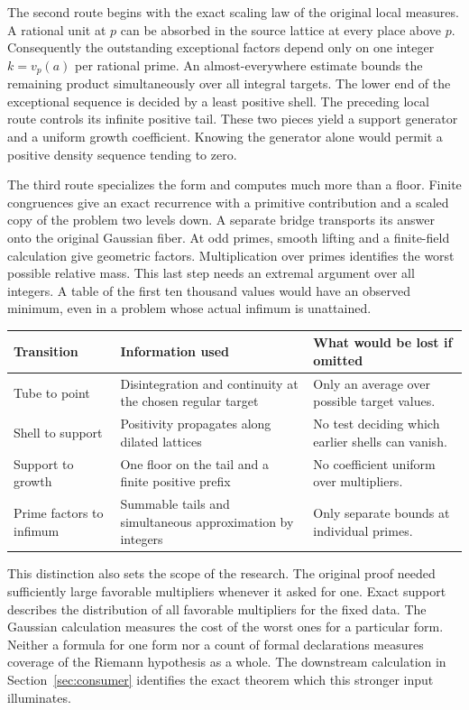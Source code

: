 \documentclass[12pt,letterpaper]{article}
\begin{document}
The second route begins with the exact scaling law of the original local measures. A rational unit at $p$ can be absorbed in the source lattice at every place above $p$. Consequently the outstanding exceptional factors depend only on one integer $k=v_p(a)$ per rational prime. An almost-everywhere estimate bounds the remaining product simultaneously over all integral targets. The lower end of the exceptional sequence is decided by a least positive shell. The preceding local route controls its infinite positive tail. These two pieces yield a support generator and a uniform growth coefficient. Knowing the generator alone would permit a positive density sequence tending to zero.

The third route specializes the form and computes much more than a floor. Finite congruences give an exact recurrence with a primitive contribution and a scaled copy of the problem two levels down. A separate bridge transports its answer onto the original Gaussian fiber. At odd primes, smooth lifting and a finite-field calculation give geometric factors. Multiplication over primes identifies the worst possible relative mass. This last step needs an extremal argument over all integers. A table of the first ten thousand values would have an observed minimum, even in a problem whose actual infimum is unattained.

\begin{center}\small
\begin{tabularx}{\linewidth}{@{}lYY@{}}\toprule
Transition & Information used & What would be lost if omitted\\\midrule
Tube to point & Disintegration and continuity at the chosen regular target & Only an average over possible target values.\\
Shell to support & Positivity propagates along dilated lattices & No test deciding which earlier shells can vanish.\\
Support to growth & One floor on the tail and a finite positive prefix & No coefficient uniform over multipliers.\\
Prime factors to infimum & Summable tails and simultaneous approximation by integers & Only separate bounds at individual primes.\\
\bottomrule\end{tabularx}
\end{center}
This distinction also sets the scope of the research. The original proof needed sufficiently large favorable multipliers whenever it asked for one. Exact support describes the distribution of all favorable multipliers for the fixed data. The Gaussian calculation measures the cost of the worst ones for a particular form. Neither a formula for one form nor a count of formal declarations measures coverage of the Riemann hypothesis as a whole. The downstream calculation in Section~\ref{sec:consumer} identifies the exact theorem which this stronger input illuminates.
\end{document}
